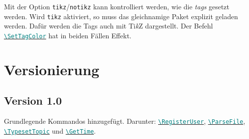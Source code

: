 \documentclass{article}
\def\cmd#1{\texttt{\textcolor{teal}{\textbackslash#1}}}
\def\cmdref#1{\hyperref[cmd:#1]{\cmd{#1}}}
\begin{document}
Mit der Option \texttt{tikz}/\texttt{notikz} kann kontrolliert werden, wie die \emph{tags} gesetzt werden. Wird \texttt{tikz} aktiviert, so muss das gleichnamige Paket explizit geladen werden.
Dafür werden die Tags auch mit Ti\textit{k}Z dargestellt. Der Befehl \cmdref{SetTagColor} hat in beiden Fällen Effekt.

\section{Versionierung}
\subsection{Version 1.0}
Grundlegende Kommandos hinzugefügt. Darunter: \cmdref{RegisterUser}, \cmdref{ParseFile}, \cmdref{TypesetTopic} und \cmdref{GetTime}.
\end{document}

